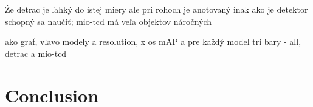 Že detrac je ľahký do istej miery ale pri rohoch je anotovaný inak ako je
detektor schopný sa naučiť; mio-tcd má veľa objektov náročných

ako graf, vľavo modely a resolution, x os mAP a pre každý model tri bary - all, detrac a mio-tcd







\chapter{Conclusion}










